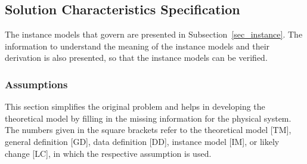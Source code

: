 \documentclass[12pt]{article}
\begin{document}
\subsection{Solution Characteristics Specification}

The instance models that govern \progname{} are presented in
Subsection~\ref{sec_instance}.  The information to understand the meaning of the
instance models and their derivation is also presented, so that the instance
models can be verified.






\subsubsection{Assumptions} \label{sec_assumpt}

This section simplifies the original problem and helps in developing the
theoretical model by filling in the missing information for the physical system.
The numbers given in the square brackets refer to the theoretical model [TM],
general definition [GD], data definition [DD], instance model [IM], or likely
change [LC], in which the respective assumption is used.
\end{document}
